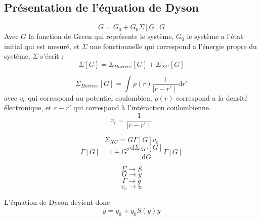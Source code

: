 \documentclass{beamer}
\begin{document}
\subsection{Pr\'esentation de l'\'equation de Dyson}

\begin{frame}
\begin{equation}
	G = G_0 + G_0 \Sigma[G] G
\end{equation}
Avec $G$ la fonction de Green qui repr\'esente le syst\`eme, $G_0$ le syst\`eme a l'\'etat initial qui est mesur\'e, et $\Sigma$ une fonctionnelle qui correspond a l'\'energie propre du syst\`eme.
$\Sigma$ s'\'ecrit :
\begin{equation}
	\Sigma[G] = \Sigma_{Hartree}[G] + \Sigma_{XC}[G]
\end{equation}

\end{frame}


\begin{frame}
 \begin{equation}
	\Sigma_{Hartree}[G] = \int \rho(r) \frac{1}{\mid r - r'\mid }\mathrm{d}r' 
\end{equation}
avec $v_c$ qui correspond au potentiel coulombien, $\rho(r)$ correspond a la densit\'e \'electronique, et $r-r'$
qui correspond à l'int\'eraction coulombienne.
\begin{equation}
	v_c =  \frac{1}{\mid r - r'\mid }
\end{equation}
\end{frame}

\begin{frame}
 \begin{equation}
	\Sigma_{XC} = G \Gamma[G] v_c
\end{equation}
\begin{equation}
	\Gamma[G] = 1 + G^2 \frac{\mathrm{d} \Sigma_{XC}[G]}{\mathrm{d}G} \Gamma[G]
\end{equation}
\end{frame}
\begin{frame}
 \begin{equation}
	\Sigma \longrightarrow S
\end{equation}
\begin{equation}
	G \longrightarrow y
\end{equation}
\begin{equation}
	\Gamma \longrightarrow g
\end{equation}
\begin{equation}
	v_c \longrightarrow u
\end{equation}

L'\'equation de Dyson devient donc
\begin{equation}
\label{dyson}
	y = y_0 + y_0 S(y) y
\end{equation}
\end{frame}
\end{document}
